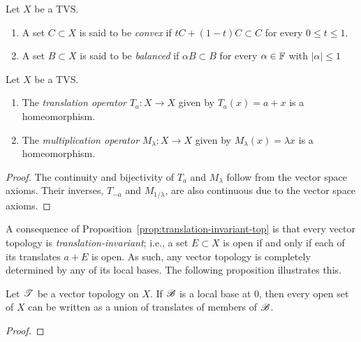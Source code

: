 \begin{definition}
	Let $X$ be a TVS.
	\mbox{}
	\begin{enumerate}[label = (\alph*),itemsep=1pt,topsep=3pt]
		\item A set $C \subset X$ is said to be \emph{convex} if $tC + (1-t)C \subset C$ for every $0 \leq t \leq 1$.
		\item A set $B \subset X$ is said to be \emph{balanced} if $\alpha B \subset B$ for every $\alpha \in \mathbb{F}$ with $|\alpha| \leq 1$
	\end{enumerate}
\end{definition}

\begin{proposition}\label{prop:translation-invariant-top}
	Let $X$ be a TVS.
	\mbox{}
	\begin{enumerate}[label = (\alph*),itemsep=1pt,topsep=3pt]
		\item The \textit{translation operator} $T_a:X \rightarrow X$ given by $T_a(x) = a + x$ is a homeomorphism.
		\item The \textit{multiplication operator} $M_\lambda:X \rightarrow X$ given by $M_\lambda(x) = \lambda x$ is a homeomorphism.
	\end{enumerate}
\end{proposition}
	\begin{proof}
		The continuity and bijectivity of $T_a$ and $M_\lambda$ follow from the vector space axioms. Their inverses, $T_{-a}$ and $M_{1/\lambda}$, are also continuous due to the vector space axioms.
	\end{proof}

\begin{remark}
A consequence of Proposition~\ref{prop:translation-invariant-top} is that every vector topology is \textit{translation-invariant}; i.e., a set $E \subset X$ is open if and only if each of its translates $a + E$ is open. As such, any vector topology is completely determined by any of its local bases. The following proposition illustrates this. 
\end{remark}

\begin{proposition}
	Let $\mathscr{T}$ be a vector topology on $X$. If $\mathscr{B}$ is a local base at $0$, then every open set of $X$ can be written as a union of translates of members of $\mathscr{B}$.
\end{proposition}
	{\color{red}
	\begin{proof}
			
	\end{proof}}

